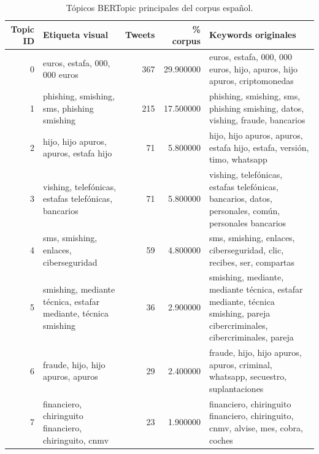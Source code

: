 \begin{table}
\caption{Tópicos BERTopic principales del corpus español.}
\label{tab:topicos_bertopic_espana}
\begin{tabular}{rlrrl}
\toprule
Topic ID & Etiqueta visual & Tweets & \% corpus & Keywords originales \\
\midrule
0 & euros, estafa, 000, 000 euros & 367 & 29.900000 & euros, estafa, 000, 000 euros, hijo, apuros, hijo apuros, criptomonedas \\
1 & phishing, smishing, sms, phishing smishing & 215 & 17.500000 & phishing, smishing, sms, phishing smishing, datos, vishing, fraude, bancarios \\
2 & hijo, hijo apuros, apuros, estafa hijo & 71 & 5.800000 & hijo, hijo apuros, apuros, estafa hijo, estafa, versión, timo, whatsapp \\
3 & vishing, telefónicas, estafas telefónicas, bancarios & 71 & 5.800000 & vishing, telefónicas, estafas telefónicas, bancarios, datos, personales, común, personales bancarios \\
4 & sms, smishing, enlaces, ciberseguridad & 59 & 4.800000 & sms, smishing, enlaces, ciberseguridad, clic, recibes, ser, compartas \\
5 & smishing, mediante técnica, estafar mediante, técnica smishing & 36 & 2.900000 & smishing, mediante, mediante técnica, estafar mediante, técnica smishing, pareja cibercriminales, cibercriminales, pareja \\
6 & fraude, hijo, hijo apuros, apuros & 29 & 2.400000 & fraude, hijo, hijo apuros, apuros, criminal, whatsapp, secuestro, suplantaciones \\
7 & financiero, chiringuito financiero, chiringuito, cnmv & 23 & 1.900000 & financiero, chiringuito financiero, chiringuito, cnmv, alvise, mes, cobra, coches \\
\bottomrule
\end{tabular}
\end{table}
